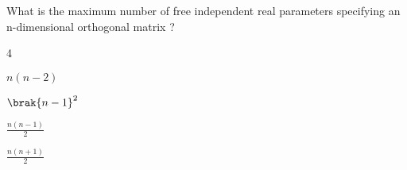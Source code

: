 	\item What is the maximum number of free independent real parameters specifying an n-dimensional orthogonal matrix ?
		\begin{enumerate}
		\end{enumerate}


